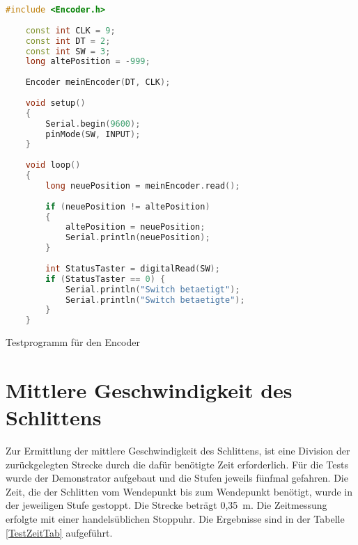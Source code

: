 \begin{code}[H]
	\begin{lstlisting}[language=c++]
	#include <Encoder.h>
	
	const int CLK = 9;
	const int DT = 2;
	const int SW = 3;
	long altePosition = -999;
	
	Encoder meinEncoder(DT, CLK);
	
	void setup()
	{
		Serial.begin(9600);
		pinMode(SW, INPUT);
	}
	
	void loop()
	{
		long neuePosition = meinEncoder.read();
		
		if (neuePosition != altePosition)
		{
			altePosition = neuePosition;
			Serial.println(neuePosition);
		}
		
		int StatusTaster = digitalRead(SW);
		if (StatusTaster == 0) {
			Serial.println("Switch betaetigt");
			Serial.println("Switch betaetigte");
		}
	}
\end{lstlisting}      

\caption[Testprogramm für den Encoder]{Testprogramm für den Encoder}\label{Code:Testprogramm für den Encoder}    
\end{code}

\section{Mittlere Geschwindigkeit des Schlittens}

Zur Ermittlung der mittlere Geschwindigkeit des Schlittens, ist eine Division der zurückgelegten Strecke durch die dafür benötigte Zeit erforderlich. Für die Tests wurde der Demonstrator aufgebaut und die Stufen jeweils fünfmal gefahren. Die Zeit, die der Schlitten vom Wendepunkt bis zum Wendepunkt benötigt, wurde in der jeweiligen Stufe gestoppt. Die Strecke beträgt 0,35\ m. Die Zeitmessung erfolgte mit einer handelsüblichen Stoppuhr. Die Ergebnisse sind in der Tabelle \ref{TestZeitTab} aufgeführt.

